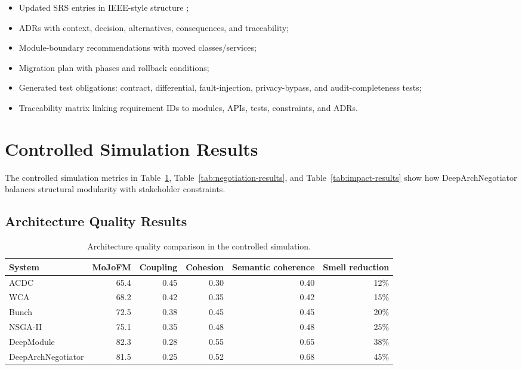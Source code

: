\documentclass[english,preprint,nonatbib]{elsarticle}
\begin{document}
\begin{itemize}[leftmargin=2em]
  \item Updated SRS entries in IEEE-style structure \cite{ieee1998srs};
  \item ADRs with context, decision, alternatives, consequences, and traceability;
  \item Module-boundary recommendations with moved classes/services;
  \item Migration plan with phases and rollback conditions;
  \item Generated test obligations: contract, differential, fault-injection, privacy-bypass, and audit-completeness tests;
  \item Traceability matrix linking requirement IDs to modules, APIs, tests, constraints, and ADRs.
\end{itemize}

\section{Controlled Simulation Results}
\label{sec:simulation-results}

The controlled simulation metrics in Table~\ref{tab:architecture-results}, Table~\ref{tab:negotiation-results}, and Table~\ref{tab:impact-results} show how DeepArchNegotiator balances structural modularity with stakeholder constraints.

\subsection{Architecture Quality Results}

\begin{table}[H]
\centering
\caption{Architecture quality comparison in the controlled simulation.}
\label{tab:architecture-results}
\begin{tabular}{p{2.4cm}rrrrr}
\toprule
System & MoJoFM & Coupling & Cohesion & Semantic coherence & Smell reduction \\
\midrule
ACDC & 65.4 & 0.45 & 0.30 & 0.40 & 12\% \\
WCA & 68.2 & 0.42 & 0.35 & 0.42 & 15\% \\
Bunch & 72.5 & 0.38 & 0.45 & 0.45 & 20\% \\
NSGA-II & 75.1 & 0.35 & 0.48 & 0.48 & 25\% \\
DeepModule & 82.3 & 0.28 & 0.55 & 0.65 & 38\% \\
DeepArchNegotiator & 81.5 & 0.25 & 0.52 & 0.68 & 45\% \\
\bottomrule
\end{tabular}
\end{table}
\end{document}
